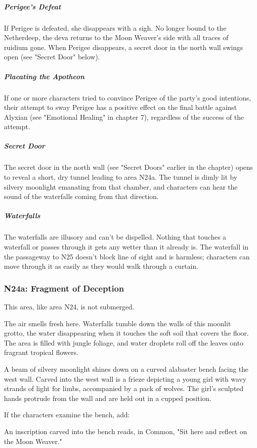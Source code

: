 \documentclass[10pt,a4paper,twoside,fancy,bg=print,twocolumn,openany,nodeprecatedcode]{dndbook}
\begin{document}
\subparagraph{Perigee's Defeat}
If Perigee is defeated, she disappears with a sigh. No longer bound to the Netherdeep, the deva returns to the Moon Weaver's side with all traces of ruidium gone. When Perigee disappears, a secret door in the north wall swings open (see "Secret Door" below).

\subparagraph{Placating the Apotheon}
If one or more characters tried to convince Perigee of the party's good intentions, their attempt to sway Perigee has a positive effect on the final battle against Alyxian (see "Emotional Healing" in chapter 7), regardless of the success of the attempt.

\subparagraph{Secret Door}
The secret door in the north wall (see "Secret Doors" earlier in the chapter) opens to reveal a short, dry tunnel leading to area N24a. The tunnel is dimly lit by silvery moonlight emanating from that chamber, and characters can hear the sound of the waterfalls coming from that direction.

\subparagraph{Waterfalls}
The waterfalls are illusory and can't be dispelled. Nothing that touches a waterfall or passes through it gets any wetter than it already is. The waterfall in the passageway to N25 doesn't block line of sight and is harmless; characters can move through it as easily as they would walk through a curtain.

\subsubsection{N24a: Fragment of Deception}
This area, like area N24, is not submerged.

\begin{DndReadAloud}{}
The air smells fresh here. Waterfalls tumble down the walls of this moonlit grotto, the water disappearing when it touches the soft soil that covers the floor. The area is filled with jungle foliage, and water droplets roll off the leaves onto fragrant tropical flowers.

A beam of silvery moonlight shines down on a curved alabaster bench facing the west wall. Carved into the west wall is a frieze depicting a young girl with wavy strands of light for limbs, accompanied by a pack of wolves. The girl's sculpted hands protrude from the wall and are held out in a cupped position.

\end{DndReadAloud}

If the characters examine the bench, add:

\begin{DndReadAloud}{}
An inscription carved into the bench reads, in Common, "Sit here and reflect on the Moon Weaver."

\end{DndReadAloud}
\end{document}
